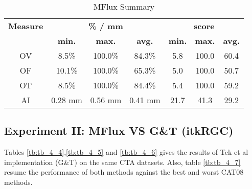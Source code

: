 \begin{table*}
\scriptsize
\caption{MFlux Summary}
\centering
\begin{tabular}{|c|ccc|ccc|}
\hline
\multicolumn{1}{|c|}{\textbf{Measure}} &\multicolumn{3}{c|}{\textbf{\% / mm}} &\multicolumn{3}{c|}{\textbf{score}}  \\
\multicolumn{1}{|c|}{\textbf{}} &\multicolumn{1}{c|}{\textbf{min.}} &\multicolumn{1}{c|}{\textbf{max.}} &\multicolumn{1}{c|}{\textbf{avg.}} &\multicolumn{1}{c|}{\textbf{min.}} &\multicolumn{1}{c|}{\textbf{max.}} &\multicolumn{1}{c|}{\textbf{avg.}}\\
\hline
OV& 8.5\%&100.0\%&84.3\%& 5.8&100.0&60.4\\
OF&10.1\%&100.0\%&65.3\%& 5.0&100.0&50.7\\
OT& 8.5\%&100.0\%&84.4\%& 5.4&100.0&59.2\\
AI&0.28 mm&0.56 mm&0.41 mm&21.7&41.3&29.2\\
\hline
\end{tabular}
\vspace{-0.3cm}
\label{tb:tb_4_3}
\normalsize
\end{table*}

\subsection{Experiment II: MFlux VS G\&T (itkRGC)}

Tables \ref{tb:tb_4_4},\ref{tb:tb_4_5} and \ref{tb:tb_4_6} gives the results of Tek et al implementation (G\&T) on the same CTA datasets. Also, table \ref{tb:tb_4_7} resume the performance of both methods against the best and worst CAT08 methods.

